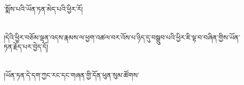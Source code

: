 ་སྨོས་པའི་ཡོན་ཏན་མེད་པའི་ཕྱིར་རོ།\chapter{ }།དེའི་ཕྱིར་བཅོམ་ལྡན་འདས་རྣམས་ལ་ཕྱག་འཚལ་བར་འོས་པ་ཉིད་དུ་བསྒྲུབ་པའི་ཕྱིར་ཇི་ལྟ་བ་བཞིན་གྱིས་ཡོན་ཏན་རྗོད་པར་བྱེད་དོ།\chapter{ }།ཡོན་ཏན་དེ་དག་ཀྱང་རང་དང་གཞན་གྱི་དོན་ཕུན་སུམ་ཚོགས་
